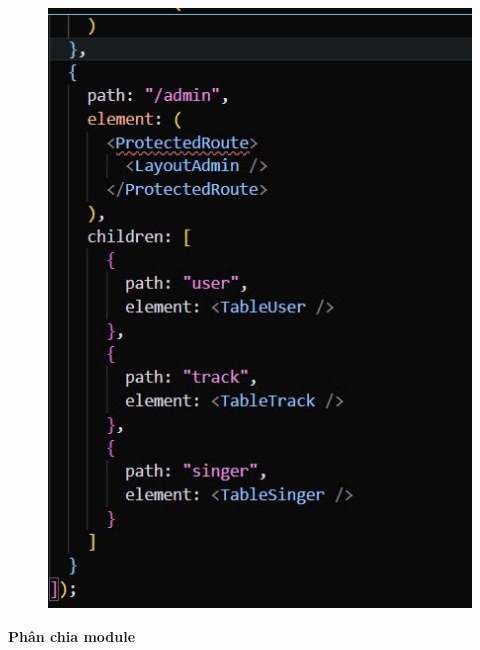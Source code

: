 \documentclass[a4paper]{article}
\begin{document}
\begin{figure}[H]
\begin{minipage}[b]{0.45\textwidth}
    \includegraphics[width=\textwidth]{img/router2.jpg}
  \end{minipage}
\end{figure}

\textbf{Phân chia module}
\end{document}
